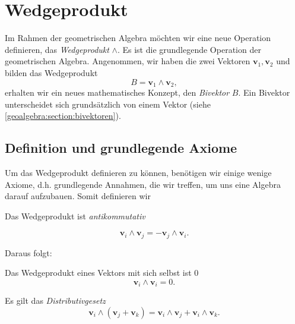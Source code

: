 
\section{Wedgeprodukt
\label{geoalgebra:section:wedgeprodukt}}

Im Rahmen der geometrischen Algebra möchten wir eine neue Operation
definieren, das \emph{Wedgeprodukt} $\wedge$.
Es ist die grundlegende Operation der geometrischen
Algebra.
Angenommen, wir haben die
zwei Vektoren $\mathbf{v}_1, \mathbf{v}_2$ und bilden das Wedgeprodukt
\begin{equation}
  B = \mathbf{v}_1 \wedge \mathbf{v}_2,
\end{equation}
erhalten wir ein neues mathematisches Konzept, den \emph{Bivektor} $B$.
Ein Bivektor unterscheidet sich grundsätzlich von einem Vektor (siehe \autoref{geoalgebra:section:bivektoren}).

\subsection{Definition und grundlegende Axiome}
\label{geoalgebra:section:axiome}
Um das Wedgeprodukt definieren zu können, benötigen wir einige wenige Axiome, d.h. grundlegende Annahmen, die wir treffen,
um uns eine Algebra darauf aufzubauen. Somit definieren wir

\begin{axiom}
  Das Wedgeprodukt ist \em{antikommutativ}

  \begin{equation}
  \mathbf{v}_i \wedge \mathbf{v}_j = -\mathbf{v}_j \wedge \mathbf{v}_i.
  \end{equation}
  \label{geoalgebra:eq:antikommutativ}
\end{axiom}
Daraus folgt:
\begin{lemma}
  \label{geoalgebra:lemma:antikommutativ}
  Das Wedgeprodukt eines Vektors mit sich selbst ist $0$
  \begin{equation*}
  \mathbf{v}_i \wedge \mathbf{v}_i = 0.
  \end{equation*}
\end{lemma}

\begin{axiom}
  Es gilt das \em{Distributivgesetz}
  \begin{equation*}
  \mathbf{v}_i \wedge (\mathbf{v}_j + \mathbf{v}_k) = \mathbf{v}_i \wedge \mathbf{v}_j + \mathbf{v}_i \wedge \mathbf{v}_k.
  \end{equation*}
\end{axiom}

